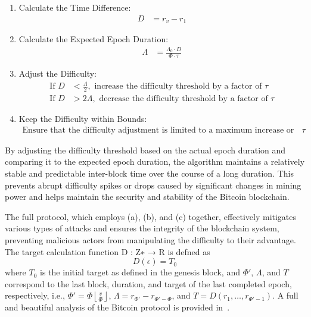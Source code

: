 \begin{enumerate}
	\item Calculate the Time Difference:
	\begin{align*}
		D &= r_v - r_1
	\end{align*}
	
	\item Calculate the Expected Epoch Duration:
	\begin{align*}
		\Lambda &= \frac{\Lambda_0 \cdot D}{\Phi \cdot \tau}
	\end{align*}
	
	\item Adjust the Difficulty:
	\begin{align*}
		\text{If } D &< \frac{\Lambda}{2}, \text{ increase the difficulty threshold by a factor of }\tau \\
		\text{If } D &> 2 \Lambda, \text{ decrease the difficulty threshold by a factor of }\tau
	\end{align*}
	
	\item Keep the Difficulty within Bounds:
	\begin{align*}
		\text{Ensure that the difficulty adjustment is limited to a maximum increase or decrease of a factor of }\tau
	\end{align*}
\end{enumerate}

By adjusting the difficulty threshold based on the actual epoch duration and comparing it to the expected epoch duration, the algorithm maintains a relatively stable and predictable inter-block time over the course of a long duration. This prevents abrupt difficulty spikes or drops caused by significant changes in mining power and helps maintain the security and stability of the Bitcoin blockchain.

The full protocol, which employs (a), (b), and (c) together, effectively mitigates various types of attacks and ensures the integrity of the blockchain system, preventing malicious actors from manipulating the difficulty to their advantage.\\
The target calculation function D : Z∗ → R is defned as
\begin{equation*}
	D(\epsilon) = T_0
\end{equation*}
where $T_0$ is the initial target as defined in the genesis block, and $\Phi'$, $\Lambda$, and $T$ correspond to the last block, duration, and target of the last completed epoch, respectively, i.e., $\Phi' = \Phi\left\lfloor\frac{v}{\Phi}\right\rfloor$, $\Lambda = r_{\Phi'} - r_{\Phi'-\Phi}$, and $T = D(r_1,\dots,r_{\Phi'-1})$. A full and beautiful analysis of the Bitcoin protocol is provided in~\cite{reference2}.

